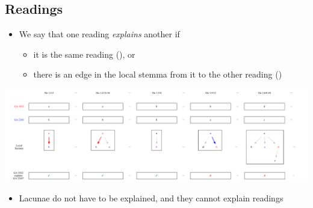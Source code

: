 \documentclass[10pt]{beamer}
\begin{document}
	\subsection{ Readings}
	\begin{frame}
		\begin{itemize}
			\item We say that one reading \emph{explains} another if
			\begin{itemize}
				\item it is the same reading (), or
				\item there is an edge in the local stemma from it to the other reading ()
			\end{itemize}
		\end{itemize}
		\begin{center}
			\includegraphics[width=\textwidth]{../img/explained-readings.pdf}
		\end{center}
		\begin{itemize}
			\item Lacunae do not have to be explained, and they cannot explain readings
		\end{itemize}
	\end{frame}
\end{document}
